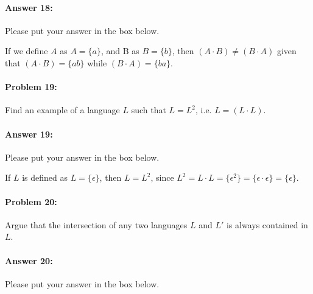 \documentclass[10pt]{article}
\newenvironment{AnswerBox}{\begin{mdframed}[style=simple]}{\end{mdframed}}
\begin{document}
\paragraph{Answer 18:} Please put your answer in the box below.

\begin{AnswerBox}%

If we define $A$ as  $A = \{a\}$, and B as $B = \{b\}$, then $(A\cdot B)\neq(B\cdot A)$ given that $(A\cdot B)= \{ab\}$ while $(B\cdot A)= \{ba\}$.
\end{AnswerBox}%

\noindent\hrulefill %

\paragraph{Problem 19:}
Find an example of a language $L$ such that $L=L^2$, i.e. $L=(L\cdot L)$.

\paragraph{Answer 19:} Please put your answer in the box below.

\begin{AnswerBox}%


  If $L$ is defined as $L = \{\epsilon\}$, then $L=L^2$, since $L^2 = L\cdot L = \{\epsilon^2\} = \{\epsilon \cdot \epsilon\} = \{\epsilon\}$.

\end{AnswerBox}%

\noindent\hrulefill %

\paragraph{Problem 20:}
Argue that the intersection of any two languages $L$ and $L'$ is always
contained in $L$.

\paragraph{Answer 20:} Please put your answer in the box below.
\end{document}
